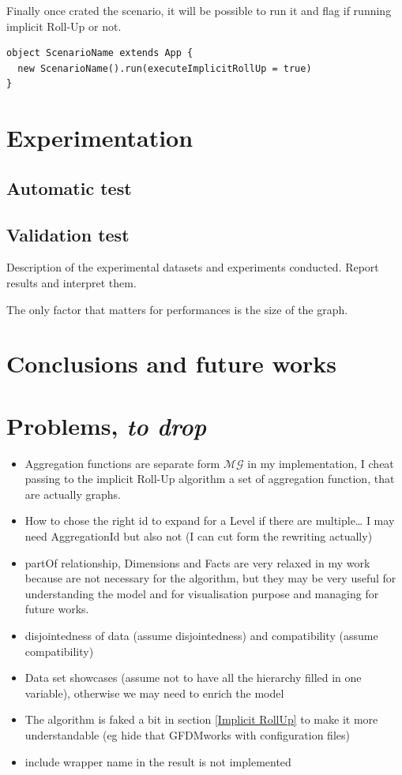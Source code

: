 \documentclass[12pt,a4paper]{report}
\newcommand\systemName{GFDM}
\newcommand\multidimensionalGraph{\mathcal{MG}}
\begin{document}
%
Finally once crated the scenario, it will be possible to run it and flag if running implicit Roll-Up or not.
%
\begin{lstlisting}[caption={My Caption},style=myScalastyle]
object ScenarioName extends App {
  new ScenarioName().run(executeImplicitRollUp = true)
}
\end{lstlisting}


\chapter{Experimentation}

\section{Automatic test}

\section{Validation test}
Description of the experimental datasets and experiments conducted. Report results and interpret them.

The only factor that matters for performances is the size of the graph.

\chapter{Conclusions and future works}



\chapter{Problems, \textit{to drop}}

\begin{itemize}
    \item Aggregation functions are separate form $\multidimensionalGraph$ in my implementation, I cheat passing to the implicit Roll-Up algorithm a set of aggregation function, that are actually graphs.
    \item How to chose the right id to expand for a Level if there are multiple… I may need AggregationId but also not (I can cut form the rewriting actually)
    \item partOf relationship, Dimensions and Facts are very relaxed in my work because are not necessary for the algorithm, but they may be very useful for understanding the model and for visualisation purpose and managing for future works.
    \item disjointedness of data (assume disjointedness) and compatibility (assume compatibility)
    \item Data set showcases (assume not to have all the hierarchy filled in one variable), otherwise we may need to enrich the model
    \item The algorithm is faked a bit in section \ref{Implicit RollUp} to make it more understandable (eg hide that \systemName works with configuration files)
    \item include wrapper name in the result is not implemented
\end{itemize}
\end{document}
